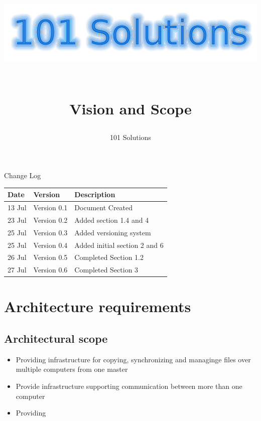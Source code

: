 \documentclass[a4paper,12pt,final]{article}
\title{
\begin{center}
  	\includegraphics[scale=0.3]{101Logo.png} 
  \end{center}
  \textbf{\\}
Vision and Scope\\
}
\author{101 Solutions}
\begin{document}
\maketitle
\thispagestyle{empty}
\newpage
\tableofcontents
\thispagestyle{empty}
\newpage
Change Log
\vspace{6pt}\newline
\begin{tabular}{|l|l|l|}
\hline
Date & Version & Description\\
\hline
13 Jul & Version 0.1 & Document Created\\
\hline
23 Jul & Version 0.2 & Added section 1.4 and 4\\
\hline
25 Jul & Version 0.3 & Added versioning system\\
\hline
25 Jul & Version 0.4 & Added initial section 2 and 6\\
\hline
26 Jul & Version 0.5 & Completed Section 1.2\\
\hline
27 Jul & Version 0.6 & Completed Section 3\\
\hline
\end{tabular}

\section{Architecture requirements}
\subsection{Architectural scope}
\begin{itemize}
\item Providing infrastructure for copying, synchronizing and managinge files over multiple computers from one master
\item Provide infrastructure supporting communication between more than one computer
\item Providing 
\end{itemize}
\end{document}
